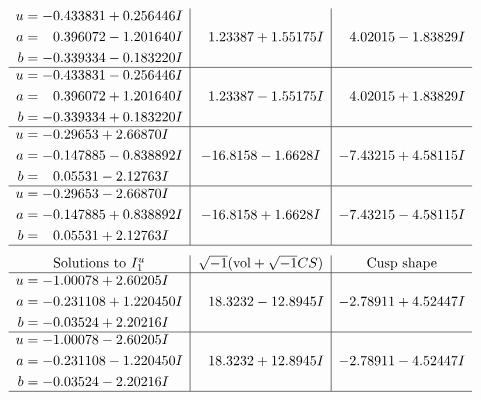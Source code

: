 \documentclass[1p]{elsarticle_modified}
\theoremstyle{definition}
\newcommand{\I}{\sqrt{-1}}
\begin{document}
$$\begin{array}{c|c|c}
\begin{aligned}
u &= -0.433831 + 0.256446 I \\
a &= \phantom{-}0.396072 - 1.201640 I \\
b &= -0.339334 - 0.183220 I\end{aligned}
 & \phantom{-}1.23387 + 1.55175 I & \phantom{-}4.02015 - 1.83829 I \\ \hline\begin{aligned}
u &= -0.433831 - 0.256446 I \\
a &= \phantom{-}0.396072 + 1.201640 I \\
b &= -0.339334 + 0.183220 I\end{aligned}
 & \phantom{-}1.23387 - 1.55175 I & \phantom{-}4.02015 + 1.83829 I \\ \hline\begin{aligned}
u &= -0.29653 + 2.66870 I \\
a &= -0.147885 - 0.838892 I \\
b &= \phantom{-}0.05531 - 2.12763 I\end{aligned}
 & -16.8158 - 1.6628 I & -7.43215 + 4.58115 I \\ \hline\begin{aligned}
u &= -0.29653 - 2.66870 I \\
a &= -0.147885 + 0.838892 I \\
b &= \phantom{-}0.05531 + 2.12763 I\end{aligned}
 & -16.8158 + 1.6628 I & -7.43215 - 4.58115 I\\
 \hline 
 \end{array}$$\newpage$$\begin{array}{c|c|c}  
\text{Solutions to }I^u_{1}& \I (\text{vol} + \sqrt{-1}CS) & \text{Cusp shape}\\
 \hline 
\begin{aligned}
u &= -1.00078 + 2.60205 I \\
a &= -0.231108 + 1.220450 I \\
b &= -0.03524 + 2.20216 I\end{aligned}
 & \phantom{-}18.3232 - 12.8945 I & -2.78911 + 4.52447 I \\ \hline\begin{aligned}
u &= -1.00078 - 2.60205 I \\
a &= -0.231108 - 1.220450 I \\
b &= -0.03524 - 2.20216 I\end{aligned}
 & \phantom{-}18.3232 + 12.8945 I & -2.78911 - 4.52447 I\\
 \hline 
 \end{array}$$\newpage\newpage\renewcommand{\arraystretch}{1}
\end{document}
